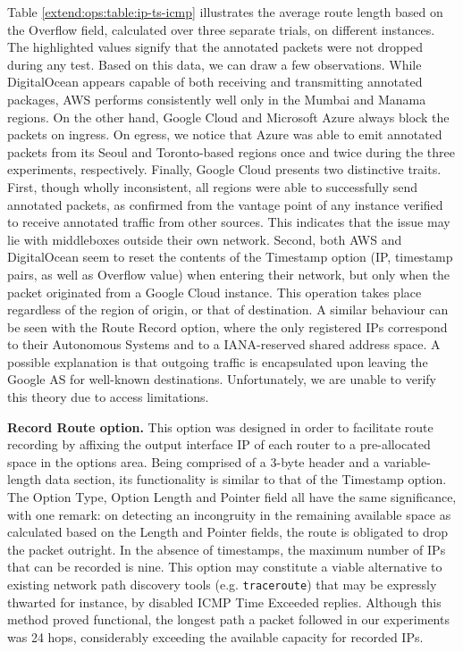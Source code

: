 Table \ref{extend:ops:table:ip-ts-icmp} illustrates the average route length based on the Overflow field, calculated over three separate trials, on different instances. The highlighted values signify that the annotated packets were not dropped during any test. Based on this data, we can draw a few observations. While DigitalOcean appears capable of both receiving and transmitting annotated packages, AWS performs consistently well only in the Mumbai and Manama regions. On the other hand, Google Cloud and Microsoft Azure always block the packets on ingress. On egress, we notice that Azure was able to emit annotated packets from its Seoul and Toronto-based regions once and twice during the three experiments, respectively. Finally, Google Cloud presents two distinctive traits. First, though wholly inconsistent, all regions were able to successfully send annotated packets, as confirmed from the vantage point of any instance verified to receive annotated traffic from other sources. This indicates that the issue may lie with middleboxes outside their own network. Second, both AWS and DigitalOcean seem to reset the contents of the Timestamp option (IP, timestamp pairs, as well as Overflow value) when entering their network, but only when the packet originated from a Google Cloud instance. This operation takes place regardless of the region of origin, or that of destination. A similar behaviour can be seen with the Route Record option, where the only registered IPs correspond to their Autonomous Systems and to a IANA-reserved shared address space. A possible explanation is that outgoing traffic is encapsulated upon leaving the Google AS for well-known destinations. Unfortunately, we are unable to verify this theory due to access limitations.

\textbf{Record Route option.} This option was designed in order to facilitate route recording by affixing the output interface IP of each router to a pre-allocated space in the options area. Being comprised of a 3-byte header and a variable-length data section, its functionality is similar to that of the Timestamp option. The Option Type, Option Length and Pointer field all have the same significance, with one remark: on detecting an incongruity in the remaining available space as calculated based on the Length and Pointer fields, the route is obligated to drop the packet outright. In the absence of timestamps, the maximum number of IPs that can be recorded is nine. This option may constitute a viable alternative to existing network path discovery tools (e.g. \texttt{traceroute}) that may be expressly thwarted for instance, by disabled ICMP Time Exceeded replies. Although this method proved functional, the longest path a packet followed in our experiments was 24 hops, considerably exceeding the available capacity for recorded IPs.

